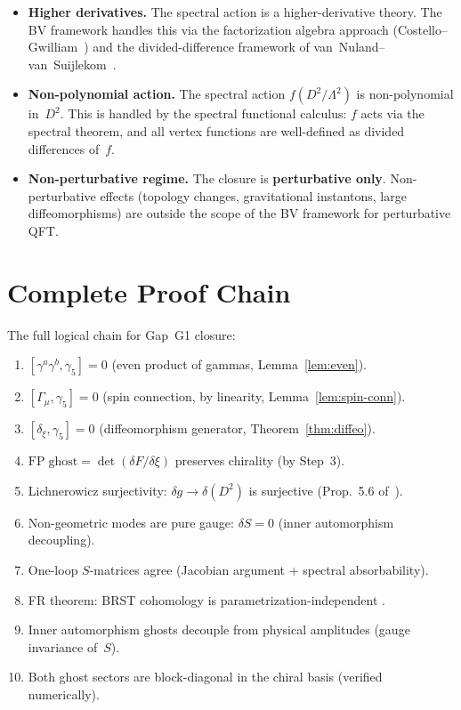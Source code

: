 \documentclass[11pt,a4paper]{article}
\newcommand{\Lam}{\Lambda}
\begin{document}
\begin{itemize}
  \item \textbf{Higher derivatives.}  The spectral action is a
    higher-derivative theory.  The BV framework handles this via
    the factorization algebra approach (Costello--Gwilliam~\cite{CG2017})
    and the divided-difference framework of
    van~Nuland--van~Suijlekom~\cite{vNvS2022}.

  \item \textbf{Non-polynomial action.}  The spectral action
    $f(D^2/\Lam^2)$ is non-polynomial in~$D^2$.  This is handled
    by the spectral functional calculus: $f$ acts via the spectral
    theorem, and all vertex functions are well-defined as divided
    differences of~$f$.

  \item \textbf{Non-perturbative regime.}  The closure is
    \textbf{perturbative only}.  Non-perturbative effects
    (topology changes, gravitational instantons, large diffeomorphisms)
    are outside the scope of the BV framework for perturbative QFT.
\end{itemize}

\section{Complete Proof Chain}
\label{sec:chain}

The full logical chain for Gap~G1 closure:

\begin{enumerate}
  \item $[\gamma^a\gamma^b, \gamma_5] = 0$
    \hfill (even product of gammas, Lemma~\ref{lem:even}).
  \item $[\Gamma_\mu, \gamma_5] = 0$
    \hfill (spin connection, by linearity, Lemma~\ref{lem:spin-conn}).
  \item $[\delta_\xi, \gamma_5] = 0$
    \hfill (diffeomorphism generator, Theorem~\ref{thm:diffeo}).
  \item $\mathrm{FP\;ghost} = \det(\delta F/\delta\xi)$ preserves chirality
    \hfill (by Step~3).
  \item Lichnerowicz surjectivity: $\delta g \to \delta(D^2)$ is surjective
    \hfill (Prop.~5.6 of~\cite{SCTchiralQ}).
  \item Non-geometric modes are pure gauge: $\delta S = 0$
    \hfill (inner automorphism decoupling).
  \item One-loop $S$-matrices agree
    \hfill (Jacobian argument + spectral absorbability).
  \item FR theorem: BRST cohomology is parametrization-independent
    \hfill \cite{FR2013}.
  \item Inner automorphism ghosts decouple from physical amplitudes
    \hfill (gauge invariance of~$S$).
  \item Both ghost sectors are block-diagonal in the chiral basis
    \hfill (verified numerically).
\end{enumerate}
\end{document}
